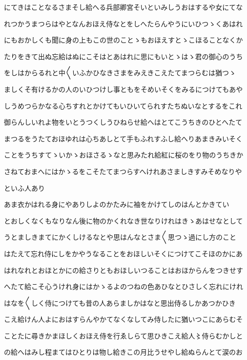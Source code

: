 \documentclass[a4paper,11pt,landscape]{ltjtarticle}
\begin{document}
\par\medskip
にてきはことなるさまそし給へる兵部卿宮そいといみしうおはするや女にてな
\par\medskip
れつかうまつらはやとなんおほえ侍なとをしへたらんやうにいひつゝくあはれ
\par\medskip
にもおかしくも聞に身の上もこの世のことゝもおほえすとゝこほることなくか
\par\medskip
たりをきて出ぬ忘給はぬにこそはとあはれに思にもいとゝはゝ君の御心のうち
\par\medskip
をしはからるれと中〱いふかひなきさまをみえきこえたてまつらむは猶つゝ
\par\medskip
ましくそ有けるかの人のいひつけし事ともをそめいそくをみるにつけてもあや
\par\medskip
しうめつらかなる心ちすれとかけてもいひいてられすたちぬいなとするをこれ
\par\medskip
御らんしいれよ物をいとうつくしうひねらせ給へはとてこうちきのひとへたて
\par\medskip
まつるをうたておほゆれは心ちあしとて手もふれすふし給へりあまきみいそく
\par\medskip
ことをうちすてゝいかゝおほさるゝなと思みたれ給紅に桜のをり物のうちきか
\par\medskip
さねておまへにはかゝるをこそたてまつらすへけれあさましきすみそめなりや
\par\medskip
といふ人あり
\par\medskip
あま衣かはれる身にやありしよのかたみに袖をかけてしのはんとかきてい
\par\medskip
とおしくなくもなりなん後に物のかくれなき世なりけれはきゝあはせなとして
\par\medskip
うとましきまてにかくしけるなとや思はんなとさま〱思つゝ過にし方のこと
\par\medskip
はたえて忘れ侍にしをかやうなることをおほしいそくにつけてこそほのかにあ
\par\medskip
はれなれとおほとかにの給さりともおほしいつることはおほからんをつきせす
\par\medskip
へたて給こそ心うけれ身にはかゝるよのつねの色あひなとひさしく忘れにけれ
\par\medskip
はなを〱しく侍につけても昔の人あらましかはなと思出侍るしかあつかひき
\par\medskip
こえ給けん人よにおはすらんやかてなくなしてみ侍したに猶いつこにあらむそ
\par\medskip
ことたに尋きかまほしくおほえ侍を行ゑしらて思ひきこえ給人〻侍らむかしと
\par\medskip
の給へはみし程まてはひとりは物し給きこの月比うせやし給ぬらんとて涙のお
\end{document}
